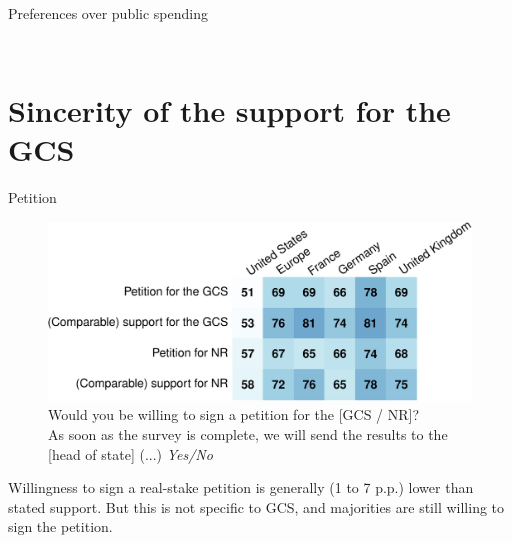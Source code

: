 \documentclass[aspectratio=169,xcolor=dvipsnames, 11pt,mathserif]{beamer}
\begin{document}
\begin{framefont}{\small}
\begin{frame}{Preferences over public spending%
	\label{} \hyperlink{foreign_aid_perceptions}{}}
\begin{columns}
\begin{column}{0.5\textwidth}
\begin{figure}
            \end{figure}
        \end{column}
    \end{columns}
	\bbvs \ip {}
	\ee 
\end{frame}

\section{Sincerity of the support for the GCS}


\begin{frame}{Petition\label{}}
    \begin{figure}
        \centering 
        \caption{Would you be willing to sign a petition for the [GCS / NR]? \\As soon as the survey is complete, we will send the results to the [head of state] (...) \textit{Yes/No} %
        }
        \vspace{-.2cm}
        \includegraphics[height=.6\textheight]{../figures/country_comparison/petition_comparable_positive.pdf} 
    \end{figure}
	\bbvs \ip Willingness to sign a real-stake petition is generally (1 to 7 p.p.) lower than stated support.
	\ip But this is not specific to GCS, and majorities are still willing to sign the petition.
    \ee
\end{frame}


\end{framefont}
\end{document}
